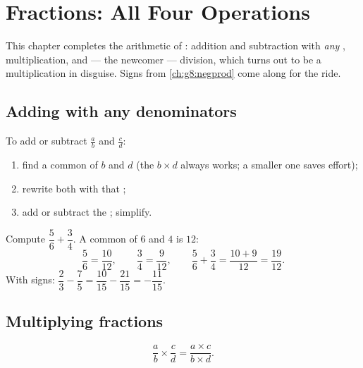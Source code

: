 \chapter{Fractions: All Four Operations}\label{ch:g8:fractions}

This chapter completes the arithmetic of : addition and
subtraction with \emph{any} , multiplication, and ---
the newcomer --- division, which turns out to be a multiplication in
disguise. Signs from \cref{ch:g8:negprod} come along for the ride.

\section{Adding with any denominators}

\begin{method}\label{met:g8:fractions:add}
To add or subtract $\frac ab$ and $\frac cd$:
\begin{enumerate}
  \item find a common  of $b$ and $d$ (the 
        $b \times d$ always works; a smaller one saves effort);
  \item rewrite both  with that ;
  \item add or subtract the ; simplify.
\end{enumerate}
\end{method}

\begin{example}\label{ex:g8:fractions:add}
Compute $\dfrac{5}{6} + \dfrac{3}{4}$. A common  of $6$ and
$4$ is $12$:
\[
\frac{5}{6} = \frac{10}{12},
\qquad
\frac{3}{4} = \frac{9}{12},
\qquad
\frac{5}{6} + \frac{3}{4} = \frac{10 + 9}{12} = \frac{19}{12}.
\]
With signs: $\dfrac{2}{3} - \dfrac{7}{5} = \dfrac{10}{15} -
\dfrac{21}{15} = -\dfrac{11}{15}$.
\end{example}

\section{Multiplying fractions}

\begin{theorem}\label{thm:g8:fractions:mult}
\[
\frac{a}{b} \times \frac{c}{d} = \frac{a \times c}{b \times d} .
\]
\end{theorem}

